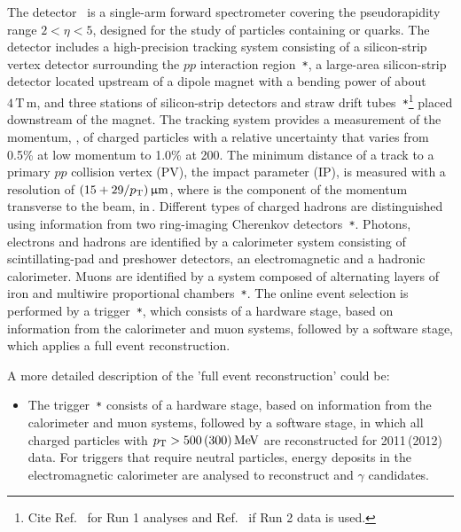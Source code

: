 The \lhcb detector~\cite{LHCb-DP-2008-001,LHCb-DP-2014-002} is a single-arm forward
spectrometer covering the \mbox{pseudorapidity} range $2<\eta <5$,
designed for the study of particles containing \bquark or \cquark
quarks. The detector includes a high-precision tracking system
consisting of a silicon-strip vertex detector surrounding the $pp$
interaction region~\cite{LHCb-DP-2014-001}\verb!*!, a large-area silicon-strip detector located
upstream of a dipole magnet with a bending power of about
$4{\mathrm{\,T\,m}}$, and three stations of silicon-strip detectors and straw
drift tubes~\cite{LHCb-DP-2013-003,LHCb-DP-2017-001}\verb!*!\footnote{Cite Ref.~\cite{LHCb-DP-2013-003} for Run 1 analyses and Ref.~\cite{LHCb-DP-2017-001} if Run 2 data is used.}
placed downstream of the magnet.
The tracking system provides a measurement of the momentum, \ptot, of charged particles with
a relative uncertainty that varies from 0.5\% at low momentum to 1.0\% at 200\gevc.
The minimum distance of a track to a primary $pp$ collision vertex (PV), the impact parameter (IP), 
is measured with a resolution of $(15+29/p_{\mathrm{T}})\,\upmu\text{m}$,
where \pt is the component of the momentum transverse to the beam, in\,\gevc.
Different types of charged hadrons are distinguished using information
from two ring-imaging Cherenkov detectors~\cite{LHCb-DP-2012-003}\verb!*!. 
Photons, electrons and hadrons are identified by a calorimeter system consisting of
scintillating-pad and preshower detectors, an electromagnetic
and a hadronic calorimeter. Muons are identified by a
system composed of alternating layers of iron and multiwire
proportional chambers~\cite{LHCb-DP-2012-002}\verb!*!.
The online event selection is performed by a trigger~\cite{LHCb-DP-2012-004}\verb!*!, 
which consists of a hardware stage, based on information from the calorimeter and muon
systems, followed by a software stage, which applies a full event
reconstruction.

A more detailed description of the 'full event reconstruction' could be:
\begin{itemize}
\item The trigger~\cite{LHCb-DP-2012-004}\verb!*! consists of a
hardware stage, based on information from the calorimeter and muon
systems, followed by a software stage, in which all charged particles
with $p_{\mathrm{T}}>500\,(300)\text{\,Me\kern -0.1em V}$ are reconstructed for 2011\,(2012) data.
For triggers that require neutral particles, 
energy deposits in the electromagnetic calorimeter are 
analysed to reconstruct \piz and $\gamma$ candidates.
\end{itemize}

